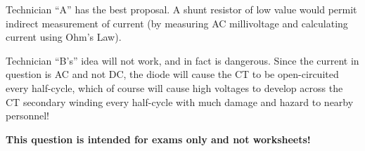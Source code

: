 Technician ``A'' has the best proposal.  A shunt resistor of low value would permit indirect measurement of current (by measuring AC millivoltage and calculating current using Ohm's Law).  

Technician ``B's'' idea will not work, and in fact is dangerous.  Since the current in question is AC and not DC, the diode will cause the CT to be open-circuited every half-cycle, which of course will cause high voltages to develop across the CT secondary winding every half-cycle with much damage and hazard to nearby personnel!







{\bf This question is intended for exams only and not worksheets!}



